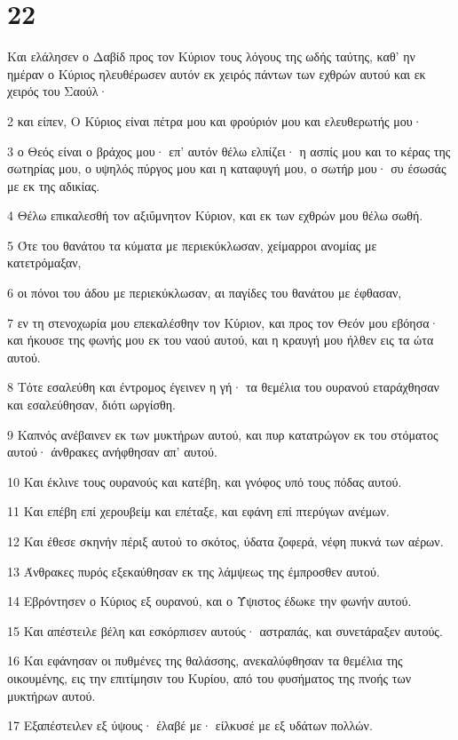 \chapter{22}

\par Και ελάλησεν ο Δαβίδ προς τον Κύριον τους λόγους της ωδής ταύτης, καθ' ην ημέραν ο Κύριος ηλευθέρωσεν αυτόν εκ χειρός πάντων των εχθρών αυτού και εκ χειρός του Σαούλ·
\par 2 και είπεν, Ο Κύριος είναι πέτρα μου και φρούριόν μου και ελευθερωτής μου·
\par 3 ο Θεός είναι ο βράχος μου· επ' αυτόν θέλω ελπίζει· η ασπίς μου και το κέρας της σωτηρίας μου, ο υψηλός πύργος μου και η καταφυγή μου, ο σωτήρ μου· συ έσωσάς με εκ της αδικίας.
\par 4 Θέλω επικαλεσθή τον αξιΰμνητον Κύριον, και εκ των εχθρών μου θέλω σωθή.
\par 5 Ότε του θανάτου τα κύματα με περιεκύκλωσαν, χείμαρροι ανομίας με κατετρόμαξαν,
\par 6 οι πόνοι του άδου με περιεκύκλωσαν, αι παγίδες του θανάτου με έφθασαν,
\par 7 εν τη στενοχωρία μου επεκαλέσθην τον Κύριον, και προς τον Θεόν μου εβόησα· και ήκουσε της φωνής μου εκ του ναού αυτού, και η κραυγή μου ήλθεν εις τα ώτα αυτού.
\par 8 Τότε εσαλεύθη και έντρομος έγεινεν η γή· τα θεμέλια του ουρανού εταράχθησαν και εσαλεύθησαν, διότι ωργίσθη.
\par 9 Καπνός ανέβαινεν εκ των μυκτήρων αυτού, και πυρ κατατρώγον εκ του στόματος αυτού· άνθρακες ανήφθησαν απ' αυτού.
\par 10 Και έκλινε τους ουρανούς και κατέβη, και γνόφος υπό τους πόδας αυτού.
\par 11 Και επέβη επί χερουβείμ και επέταξε, και εφάνη επί πτερύγων ανέμων.
\par 12 Και έθεσε σκηνήν πέριξ αυτού το σκότος, ύδατα ζοφερά, νέφη πυκνά των αέρων.
\par 13 Άνθρακες πυρός εξεκαύθησαν εκ της λάμψεως της έμπροσθεν αυτού.
\par 14 Εβρόντησεν ο Κύριος εξ ουρανού, και ο Ύψιστος έδωκε την φωνήν αυτού.
\par 15 Και απέστειλε βέλη και εσκόρπισεν αυτούς· αστραπάς, και συνετάραξεν αυτούς.
\par 16 Και εφάνησαν οι πυθμένες της θαλάσσης, ανεκαλύφθησαν τα θεμέλια της οικουμένης, εις την επιτίμησιν του Κυρίου, από του φυσήματος της πνοής των μυκτήρων αυτού.
\par 17 Εξαπέστειλεν εξ ύψους· έλαβέ με· είλκυσέ με εξ υδάτων πολλών.

